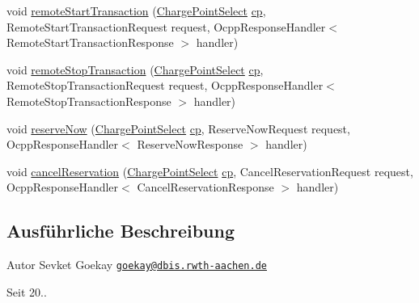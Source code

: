 \begin{DoxyCompactItemize}
\item 
void \hyperlink{interfacede_1_1rwth_1_1idsg_1_1steve_1_1ocpp_1_1_charge_point_service15___invoker_ab70a0f730ee43fe4123291d211e31271}{remote\-Start\-Transaction} (\hyperlink{classde_1_1rwth_1_1idsg_1_1steve_1_1repository_1_1dto_1_1_charge_point_select}{Charge\-Point\-Select} \hyperlink{get_transaction_ids_8js_a02fb69feb56940fd46d72ea6a60e511f}{cp}, Remote\-Start\-Transaction\-Request request, Ocpp\-Response\-Handler$<$ Remote\-Start\-Transaction\-Response $>$ handler)
\item 
void \hyperlink{interfacede_1_1rwth_1_1idsg_1_1steve_1_1ocpp_1_1_charge_point_service15___invoker_a50d840b72b8705214b4c5d9e235be133}{remote\-Stop\-Transaction} (\hyperlink{classde_1_1rwth_1_1idsg_1_1steve_1_1repository_1_1dto_1_1_charge_point_select}{Charge\-Point\-Select} \hyperlink{get_transaction_ids_8js_a02fb69feb56940fd46d72ea6a60e511f}{cp}, Remote\-Stop\-Transaction\-Request request, Ocpp\-Response\-Handler$<$ Remote\-Stop\-Transaction\-Response $>$ handler)
\item 
void \hyperlink{interfacede_1_1rwth_1_1idsg_1_1steve_1_1ocpp_1_1_charge_point_service15___invoker_ad550c0db63a3276b7103a6344bd18c22}{reserve\-Now} (\hyperlink{classde_1_1rwth_1_1idsg_1_1steve_1_1repository_1_1dto_1_1_charge_point_select}{Charge\-Point\-Select} \hyperlink{get_transaction_ids_8js_a02fb69feb56940fd46d72ea6a60e511f}{cp}, Reserve\-Now\-Request request, Ocpp\-Response\-Handler$<$ Reserve\-Now\-Response $>$ handler)
\item 
void \hyperlink{interfacede_1_1rwth_1_1idsg_1_1steve_1_1ocpp_1_1_charge_point_service15___invoker_ab430420546dd1a3147d04b619ef088e9}{cancel\-Reservation} (\hyperlink{classde_1_1rwth_1_1idsg_1_1steve_1_1repository_1_1dto_1_1_charge_point_select}{Charge\-Point\-Select} \hyperlink{get_transaction_ids_8js_a02fb69feb56940fd46d72ea6a60e511f}{cp}, Cancel\-Reservation\-Request request, Ocpp\-Response\-Handler$<$ Cancel\-Reservation\-Response $>$ handler)
\end{DoxyCompactItemize}


\subsection{Ausführliche Beschreibung}
\begin{DoxyAuthor}{Autor}
Sevket Goekay \href{mailto:goekay@dbis.rwth-aachen.de}{\tt goekay@dbis.\-rwth-\/aachen.\-de} 
\end{DoxyAuthor}
\begin{DoxySince}{Seit}
20.. 
\end{DoxySince}


